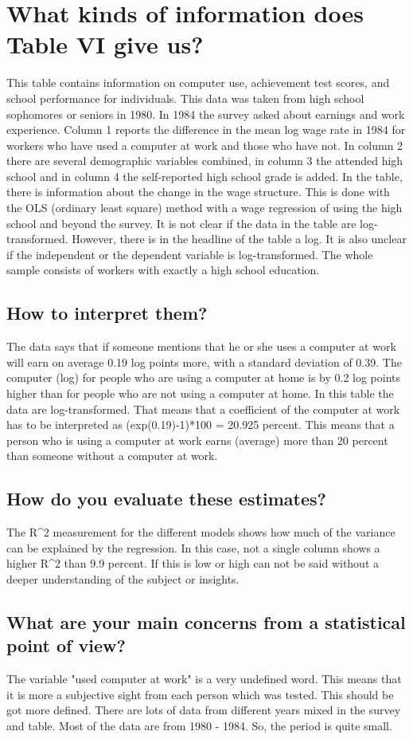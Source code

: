 
\chapter{What kinds of information does Table VI give us?}
This table contains information on computer use, achievement test scores, and school performance for individuals. This data was taken from high school sophomores or seniors in 1980. In 1984 the survey asked about earnings and work experience. Column 1 reports the difference in the mean log wage rate in 1984 for workers who have used a computer at work and those who have not. In column 2 there are several demographic variables combined, in column 3 the attended high school and in column 4 the self-reported high school grade is added. In the table, there is information about the change in the wage structure. This is done with the OLS (ordinary least square) method with a wage regression of using the high school and beyond the survey. It is not clear if the data in the table are log-transformed. However, there is in the headline of the table a log. It is also unclear if the independent or the dependent variable is log-transformed. The whole sample consists of workers with exactly a high school education. 


\section{ How to interpret them?} 
The data says that if someone mentions that he or she uses a computer at work will earn on average 0.19 log points more, with a standard deviation of 0.39.
The computer (log) for people who are using a computer at home is by 0.2 log points higher than for people who are not using a computer at home.
In this table the data are log-transformed. That means that a coefficient of the computer at work has to be interpreted as  (exp(0.19)-1)*100 = 20.925 percent. This means that a person who is using a computer at work earns (average) more than 20 percent than someone without a computer at work. 

\section{How do you evaluate these estimates?}
The R^2 measurement for the different models shows how much of the variance can be explained by the regression. In this case, not a single column shows a higher R^2 than 9.9 percent. If this is low or high can not be said without a deeper understanding of the subject or insights. 

\section{What are your main concerns from a statistical point of view?}
The variable "used computer at work" is a very undefined word. This means that it is more a subjective sight from each person which was tested. This should be got more defined. 
There are lots of data from different years mixed in the survey and table. Most of the data are from 1980 - 1984. So, the period is quite small. 
